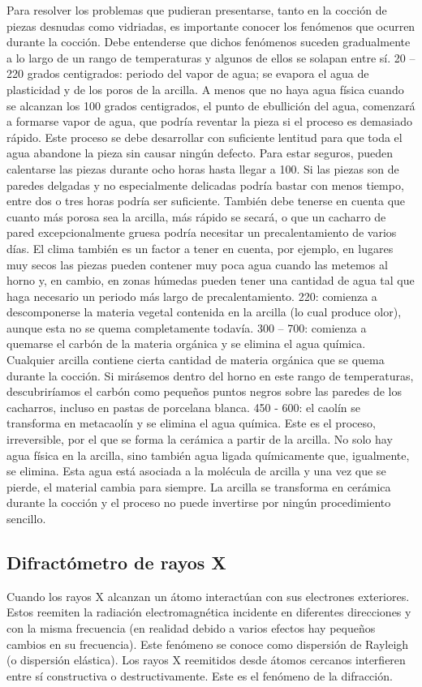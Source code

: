 \documentclass[a4paper, 11pt]{article}
\begin{document}
Para resolver los problemas que pudieran presentarse, tanto en la cocción de piezas desnudas como vidriadas, es importante conocer los fenómenos que ocurren durante la cocción.
Debe entenderse que dichos fenómenos suceden gradualmente a lo largo de un rango de temperaturas y algunos de ellos se solapan entre sí. 20 – 220 grados centigrados: periodo del vapor de agua; se evapora el agua de plasticidad y de los poros de la arcilla.
A menos que no haya agua física cuando se alcanzan los 100 grados centigrados, el punto de ebullición del agua, comenzará a formarse vapor de agua, que podría reventar la pieza si el proceso es demasiado rápido. Este proceso se debe desarrollar con suficiente lentitud para que toda el agua abandone la pieza sin causar ningún defecto. Para estar seguros, pueden calentarse las piezas durante ocho horas hasta llegar a 100. Si las piezas son de paredes delgadas y no especialmente delicadas podría bastar con menos tiempo, entre dos o tres horas podría ser suficiente. También debe tenerse en cuenta que cuanto más porosa sea la arcilla, más rápido se secará, o que un cacharro de pared excepcionalmente gruesa podría necesitar un precalentamiento de varios días. El clima también es un factor a tener en cuenta, por ejemplo, en lugares muy secos las piezas pueden contener muy poca agua cuando las metemos al horno y, en cambio, en zonas húmedas pueden tener una cantidad de agua tal que haga necesario un periodo más largo de precalentamiento.
220: comienza a descomponerse la materia vegetal contenida en la arcilla (lo cual produce olor), aunque esta no se quema completamente todavía. 
300 – 700: comienza a quemarse el carbón de la materia orgánica y se elimina el agua química.
Cualquier arcilla contiene cierta cantidad de materia orgánica que se quema durante la cocción. Si mirásemos dentro del horno en este rango de temperaturas, descubriríamos el carbón como pequeños puntos negros sobre las paredes de los cacharros, incluso en pastas de porcelana blanca.
450 - 600: el caolín se transforma en metacaolín y se elimina el agua química.
Este es el proceso, irreversible, por el que se forma la cerámica a partir de la arcilla. No solo hay agua física en la arcilla, sino también agua ligada químicamente que, igualmente, se elimina. Esta agua está asociada a la molécula de arcilla y una vez que se pierde, el material cambia para siempre. La arcilla se transforma en cerámica durante la cocción y el proceso no puede invertirse por ningún procedimiento sencillo.
  

\subsection{Difractómetro de rayos X}
Cuando los rayos X alcanzan un átomo interactúan con sus electrones exteriores. Estos reemiten la radiación electromagnética incidente en diferentes direcciones y con la misma frecuencia (en realidad debido a varios efectos hay pequeños cambios en su frecuencia). Este fenómeno se conoce como dispersión de Rayleigh (o dispersión elástica). Los rayos X reemitidos desde átomos cercanos interfieren entre sí constructiva o destructivamente. Este es el fenómeno de la difracción.\\
\end{document}
